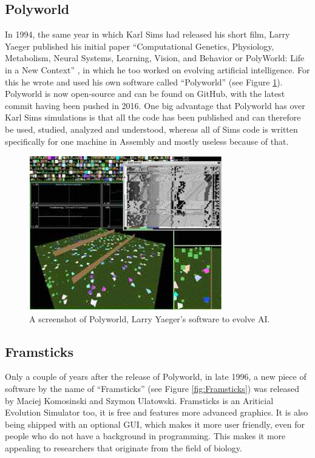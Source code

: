 \documentclass[12pt,oneside,listof=totoc,paper=a4,headings=small]{scrbook}
\begin{document}
\subsection{Polyworld}
In 1994, the same year in which Karl Sims had released his short film, Larry Yaeger published his initial paper ``Computational Genetics, Physiology, Metabolism, Neural Systems, Learning, Vision, and Behavior or PolyWorld: Life in a New Context'' \cite{yaeger1994computational}, in which he too worked on evolving artificial intelligence. For this he wrote and used his own software called ``Polyworld'' (see Figure \ref{fig:Polyworld}). Polyworld is now open-source and can be found on GitHub, with the latest commit having been pushed in 2016. 
One big advantage that Polyworld has over Karl Sims simulations is that all the code has been published and can therefore be used, studied, analyzed and understood, whereas all of Sims code is written specifically for one machine in Assembly and mostly useless because of that.
\begin{figure}[h!]
\centering
\includegraphics[width=0.75\textwidth,height=0.75\textheight,keepaspectratio]{images/image001.png}
\caption{A screenshot of Polyworld, Larry Yaeger's software to evolve AI.~\cite{polypicture}}
\label{fig:Polyworld}
\end{figure}

\newpage

\subsection{Framsticks}
Only a couple of years after the release of Polyworld, in late 1996, a new piece of software by the name of ``Framsticks'' (see Figure \ref{fig:Framsticks}) \cite{komosinski1999framsticks} was released by Maciej Komosinski and Szymon Ulatowski. Framsticks is an Ariticial Evolution Simulator too, it is free and features more advanced graphics. It is also being shipped with an optional GUI, which makes it more user friendly, even for people who do not have a background in programming. This makes it more appealing to researchers that originate from the field of biology.
\end{document}
